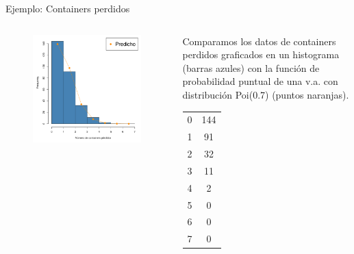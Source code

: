 \documentclass{beamer}
\theoremstyle{definition}
\begin{document}
\begin{frame}{\color{rosee}Ejemplo: Containers perdidos}\small
  \begin{columns}
    \begin{column}{.6\textwidth}
      \begin{figure}
        \centering
        \includegraphics[height=.8\textheight]{slides3/img/hist-soldados-poisson.pdf}
      \end{figure}
    \end{column}
    \begin{column}{.4\textwidth}
     \small Comparamos los datos de containers perdidos graficados en un histograma \color{dodgerblue}(barras azules) \color{black} con la función de probabilidad puntual de una v.a. con distribución Poi(0.7) \color{orang}(puntos naranjas)\color{black}.
      \begin{table}
        \centering
        \begin{tabular}{c| c}
          0& 144\\
          1& 91 \\
          2& 32 \\
          3& 11 \\
          4& 2 \\
          5& 0 \\
          6& 0 \\
          7& 0 
        \end{tabular}
      \end{table}
    \end{column}
  \end{columns}
\end{frame}
\end{document}
